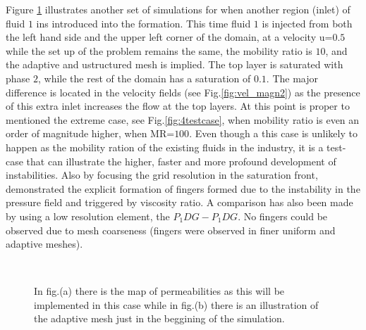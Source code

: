 \documentclass[preprint,authoryear,12pt]{elsarticle}
\begin{document}
\medskip
Figure \ref{fig:3testcase_a} illustrates another set of simulations for when another region (inlet) of fluid $1$ ins introduced into the formation. This time fluid $1$ is injected from both the left hand side and the upper left corner of the domain, at a velocity u=$0.5$ while the set up of the problem remains the same, the mobility ratio is $10$, and the adaptive and ustructured mesh is implied. The top layer is saturated with phase $2$, while the rest of the domain has a saturation of $0.1$. The major difference is located in the velocity fields (see Fig.\ref{fig:vel_magn2}) as the presence of this extra inlet increases the flow at the top layers. At this point is proper to mentioned the extreme case, see Fig.\ref{fig:4testcase}, when mobility ratio is even an order of magnitude higher, when MR=$100$. Even though a this case is unlikely to happen as the mobility ration of the existing fluids in the industry, it is a test-case that can illustrate the higher, faster and more profound development of instabilities. Also by focusing the grid resolution in the saturation front, \citet{christou_2015}  demonstrated the explicit formation of fingers formed due to the instability in the pressure ﬁeld and triggered by viscosity ratio. A comparison has also been made by using a low resolution element, the $P_{1}DG-P_{1}DG$. No fingers could be observed due to mesh coarseness (fingers were observed in ﬁner uniform and adaptive meshes).

\begin{figure}
\centering
{}\\[2mm]%
%
\caption{In fig.(a) there is the map of permeabilities as this will be implemented in this case while in fig.(b) there is an illustration of the adaptive mesh just in the beggining of the simulation.}
\label{fig:3testcase_a}
\end{figure}
\end{document}
